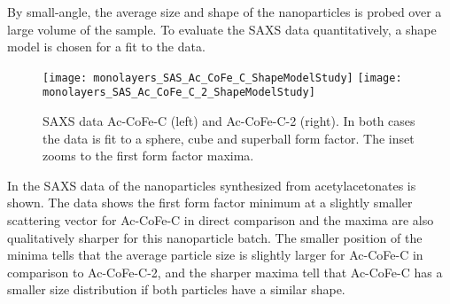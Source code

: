 \documentclass[\main/dresen_thesis.tex]{subfiles}
\begin{document}
  \label{sec:monolayers:nanoparticle:saxs}

  By small-angle, the average size and shape of the nanoparticles is probed over a large volume of the sample.
  To evaluate the SAXS data quantitatively, a shape model is chosen for a fit to the data.

  \begin{figure}[tb]
    \centering
    \texttt{[image: monolayers\_SAS\_Ac\_CoFe\_C\_ShapeModelStudy]}
    \texttt{[image: monolayers\_SAS\_Ac\_CoFe\_C\_2\_ShapeModelStudy]}
    \caption{\label{fig:monolayers:nanoparticle:sas:AcAcCoFeC}SAXS data Ac-CoFe-C (left) and Ac-CoFe-C-2 (right). In both cases the data is fit to a sphere, cube and superball form factor. The inset zooms to the first form factor maxima.}
  \end{figure}

    In  the SAXS data of the nanoparticles synthesized from acetylacetonates is shown.
    The data shows the first form factor minimum at a slightly smaller scattering vector for Ac-CoFe-C in direct comparison and the maxima are also qualitatively sharper for this nanoparticle batch.
    The smaller position of the minima tells that the average particle size is slightly larger for Ac-CoFe-C in comparison to Ac-CoFe-C-2, and the sharper maxima tell that Ac-CoFe-C has a smaller size distribution if both particles have a similar shape.
\end{document}
